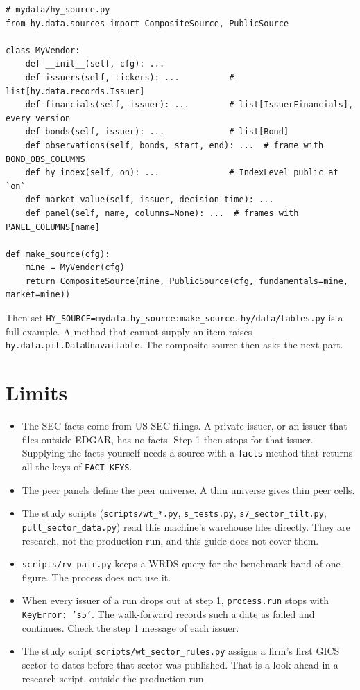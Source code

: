 \documentclass[10.5pt,a4paper]{article}
\newcommand{\code}[1]{\texttt{\small #1}}
\begin{document}
\begin{lstlisting}
# mydata/hy_source.py
from hy.data.sources import CompositeSource, PublicSource

class MyVendor:
    def __init__(self, cfg): ...
    def issuers(self, tickers): ...          # list[hy.data.records.Issuer]
    def financials(self, issuer): ...        # list[IssuerFinancials], every version
    def bonds(self, issuer): ...             # list[Bond]
    def observations(self, bonds, start, end): ...  # frame with BOND_OBS_COLUMNS
    def hy_index(self, on): ...              # IndexLevel public at `on`
    def market_value(self, issuer, decision_time): ...
    def panel(self, name, columns=None): ...  # frames with PANEL_COLUMNS[name]

def make_source(cfg):
    mine = MyVendor(cfg)
    return CompositeSource(mine, PublicSource(cfg, fundamentals=mine, market=mine))
\end{lstlisting}

Then set \code{HY\_\allowbreak{}SOURCE=mydata.hy\_\allowbreak{}source:make\_\allowbreak{}source}. \code{hy/\allowbreak{}data/\allowbreak{}tables.py} is a full example. A method that cannot supply an item raises \code{hy.data.pit.DataUnavailable}. The composite source then asks the next part.

\section{Limits}

\begin{itemize}
\item The SEC facts come from US SEC filings. A private issuer, or an issuer that files outside EDGAR, has no facts. Step 1 then stops for that issuer. Supplying the facts yourself needs a source with a \code{facts} method that returns all the keys of \code{FACT\_\allowbreak{}KEYS}.
\item The peer panels define the peer universe. A thin universe gives thin peer cells.
\item The study scripts (\code{scripts/\allowbreak{}wt\_\allowbreak{}*.py}, \code{s\_\allowbreak{}tests.py}, \code{s7\_\allowbreak{}sector\_\allowbreak{}tilt.py}, \code{pull\_\allowbreak{}sector\_\allowbreak{}data.py}) read this machine's warehouse files directly. They are research, not the production run, and this guide does not cover them.
\item \code{scripts/\allowbreak{}rv\_\allowbreak{}pair.py} keeps a WRDS query for the benchmark band of one figure. The process does not use it.
\item When every issuer of a run drops out at step 1, \code{process.run} stops with \code{KeyError: 's5'}. The walk-forward records such a date as failed and continues. Check the step 1 message of each issuer.
\item The study script \code{scripts/\allowbreak{}wt\_\allowbreak{}sector\_\allowbreak{}rules.py} assigns a firm's first GICS sector to dates before that sector was published. That is a look-ahead in a research script, outside the production run.
\end{itemize}
\end{document}

